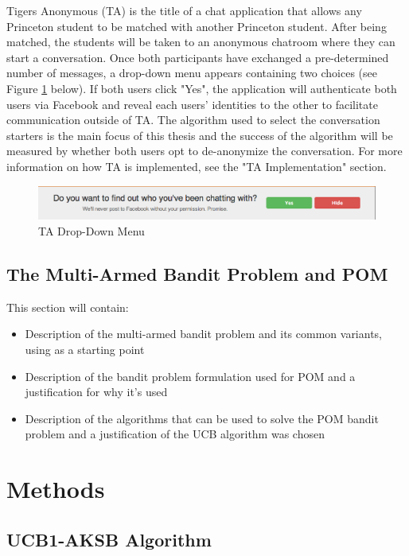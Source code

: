 \documentclass{report}
\begin{document}
Tigers Anonymous (TA) is the title of a chat application that allows any Princeton student to be matched with another Princeton student. After being matched, the students will be taken to an anonymous chatroom where they can start a conversation. Once both participants have exchanged a pre-determined number of messages, a drop-down menu appears containing two choices (see Figure \ref{fig:DropDownMenu} below). If both users click "Yes", the application will authenticate both users via Facebook and reveal each users' identities to the other to facilitate communication outside of TA. The algorithm used to select the conversation starters is the main focus of this thesis and the success of the algorithm will be measured by whether both users opt to de-anonymize the conversation. For more information on how TA is implemented, see the "TA Implementation" section.

\begin{figure}[h]
\centering
\includegraphics[trim= 0mm 0mm 2mm 2mm, clip, scale=0.36]{./Pictures/DropDownMenu}
\caption{TA Drop-Down Menu}
\label{fig:DropDownMenu}
\end{figure}

\section{The Multi-Armed Bandit Problem and POM}

This section will contain: 
\begin{itemize}
\item Description of the multi-armed bandit problem and its common variants, using \citet{bubeck12} as a starting point
\item Description of the bandit problem formulation used for POM and a justification for why it's used
\item Description of the algorithms that can be used to solve the POM bandit problem and a justification of the UCB algorithm was chosen
\end{itemize}

\chapter{Methods}

\section{UCB1-AKSB Algorithm}
\end{document}
